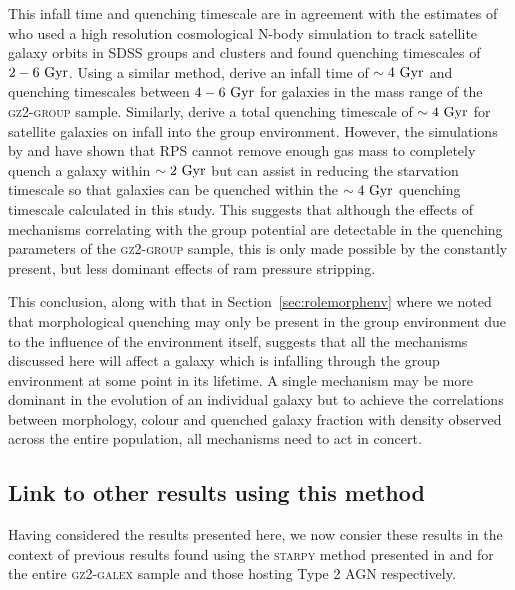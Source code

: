 \documentclass[useAMS,usenatbib]{mn2e}
\begin{document}
This infall time and quenching timescale are in agreement with the estimates of \cite{wetzel13} who used a high resolution cosmological N-body simulation to track satellite galaxy orbits in SDSS groups and clusters and found quenching timescales of $2-6~\rm{Gyr}$. Using a similar method, \cite{oman16} derive an infall time of $\sim4~\rm{Gyr}$ and quenching timescales between $4-6~\rm{Gyr}$ for galaxies in the mass range of the \textsc{gz2-group} sample. Similarly, \cite{hahn16} derive a total quenching timescale of $\sim4~\rm{Gyr}$ for satellite galaxies on infall into the group environment. However, the simulations by \cite{fillingham16} and \cite{emerick16} have shown that RPS cannot remove enough gas mass to completely quench a galaxy within $\sim2~\rm{Gyr}$ but can assist in reducing the starvation timescale so that galaxies can be quenched within the $\sim4~\rm{Gyr}$ quenching timescale calculated in this study. This suggests that although the effects of mechanisms correlating with the group potential are detectable in the quenching parameters of the \textsc{gz2-group} sample, this is only made possible by the constantly present, but less dominant effects of ram pressure stripping. 

This conclusion, along with that in Section~\ref{sec:rolemorphenv} where we noted that morphological quenching may only be present in the group environment due to the influence of the environment itself, suggests that all the mechanisms discussed here will affect a galaxy which is infalling through the group environment at some point in its lifetime. A single mechanism may be more dominant in the evolution of an individual galaxy but to achieve the correlations between morphology, colour and quenched galaxy fraction with density observed across the entire population, all mechanisms need to act in concert.  

\subsection{Link to other results using this method}\label{sec:bigpic}

Having considered the results presented here, we now consier these results in the context of previous results found using the \textsc{starpy} method presented in \cite{smethurst15} and \cite{smethurst16} for the entire \textsc{gz2-galex} sample and those hosting Type 2 AGN respectively.

\end{document}
